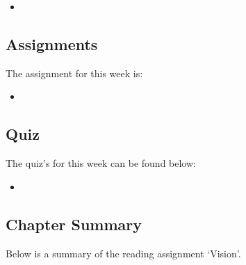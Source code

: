 \begin{itemize}
    \item {}
\end{itemize}

\subsection{Assignments}

The assignment for this week is:

\begin{itemize}
    \item {}
\end{itemize}

\subsection{Quiz}

The quiz's for this week can be found below:

\begin{itemize}
    \item {}
\end{itemize}

\subsection{Chapter Summary}

Below is a summary of the reading assignment `Vision'.

